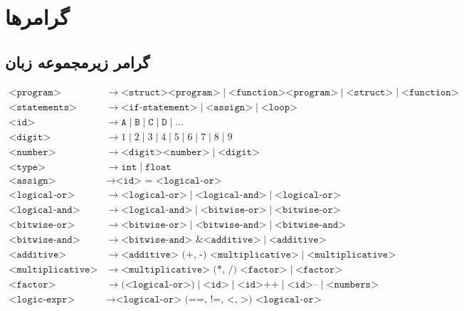 \documentclass[12pt, a4paper]{report}
\begin{document}
\section{گرامرها}
\subsection{گرامر زیرمجموعه زبان}

\begin{align*}
	\texttt{<program>} &\rightarrow \texttt{<struct><program>} \mid \texttt{<function><program>} \mid \texttt{<struct>} \mid \texttt{<function>} \\
	\texttt{<statements>} &\rightarrow \texttt{<if-statement>} \mid \texttt{<assign>} \mid \texttt{<loop>} \\
	\texttt{<id>} &\rightarrow \texttt{A} \mid \texttt{B} \mid \texttt{C} \mid \texttt{D} \mid \ldots \\
	\texttt{<digit>} &\rightarrow 1 \mid 2 \mid 3 \mid 4 \mid 5 \mid 6 \mid 7 \mid 8 \mid 9 \\
	\texttt{<number>} &\rightarrow \texttt{<digit><number>} \mid \texttt{<digit>} \\
	\texttt{<type>} &\rightarrow \texttt{int} \mid \texttt{float} \\
	\texttt{<assign>} &\rightarrow \texttt{<id> = <logical-or>} \\
	\texttt{<logical-or>} &\rightarrow \texttt{<logical-or>} \mid \texttt{<logical-and>} \mid \texttt{<logical-or>} \\
	\texttt{<logical-and>} &\rightarrow \texttt{<logical-and>} \mid \texttt{<bitwise-or>} \mid \texttt{<bitwise-or>} \\
	\texttt{<bitwise-or>} &\rightarrow \texttt{<bitwise-or>} \mid \texttt{<bitwise-and>} \mid \texttt{<bitwise-and>} \\
	\texttt{<bitwise-and>} &\rightarrow \texttt{<bitwise-and> \& <additive>} \mid \texttt{<additive>} \\
	\texttt{<additive>} &\rightarrow \texttt{<additive> (+, -) <multiplicative>} \mid \texttt{<multiplicative>} \\
	\texttt{<multiplicative>} &\rightarrow \texttt{<multiplicative> (*, /) <factor>} \mid \texttt{<factor>} \\
	\texttt{<factor>} &\rightarrow \texttt{(<logical-or>)} \mid \texttt{<id>} \mid \texttt{<id>++} \mid \texttt{<id>--} \mid \texttt{<numbers>} \\
	\texttt{<logic-expr>} &\rightarrow \texttt{<logical-or> (==, !=, <, >) <logical-or>} \\

\end{align*}
\end{document}
